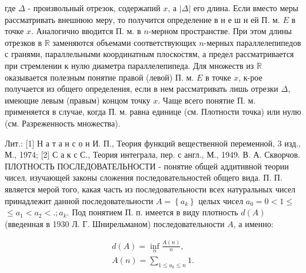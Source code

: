\documentclass[10pt]{article}
\begin{document}
где $\Delta$ - произвольный отрезок, содержапий $x$, а $|\Delta|$ его длина. Если вместо меры рассматривать внешнюю меру, то получится определение в н е ш н ей П. м. $E$ в точке $x$. Аналогично вводится П. м. в $n$-мерном пространстве. При этом длины отрезков в $\mathbb{R}$ заменяются объемами соответствующих $n$-мерных параллелепипедов с гранями, параллельными координатным плоскостям, а предел рассматривается при стремлении к нулю диаметра параллелепипеда. Для множеств из $\mathbb{R}$ оказывается полезным понятие правой (левой) П. м. $E$ в точке $x$, к-рое получается из общего определения, если в нем рассматривать лишь отрезки $\Delta$, имеющие левым (правым) концом точку $x$. Чаще всего понятие П. м. применяется в случае, когда П. м. равна единице (см. Плотности точка) или нулю (см. Разреженность множества).



Лит.: [1] Н а т а н с о н И. П., Теория функций вещественной переменной, 3 изд., М., 1974; [2] С а к с С., Теория интеграла, пер. с англ., М., 1949. В. А. Скворчов. ПЛОТНОСТЬ ПОСЛЕДОВАТЕЛЬНОСТИ - понятие общей аддитивной теории чисел, изучающей законы сложения последовательностей общего вида. П. П. является мерой того, какая часть из последовательности всех натуральных чисел принадлежит данной последовательности $A=\left\{a_{k}\right\}$ целых чисел $a_{0}=0<1 \leqslant$ $\leqslant a_{1}<a_{2}<. ; a_{k}$. Под понятием П. п. имеется в виду плотность $d(A)$ (введенная в 1930 Л. Г. Шнирельманом) последовательности $A$, а именно:



\[

\begin{gathered}

d(A)=\inf _{n} \frac{A(n)}{n}, \\

A(n)=\sum_{1 \leqslant a_{k} \leqslant n} 1 .

\end{gathered}

\]
\end{document}
